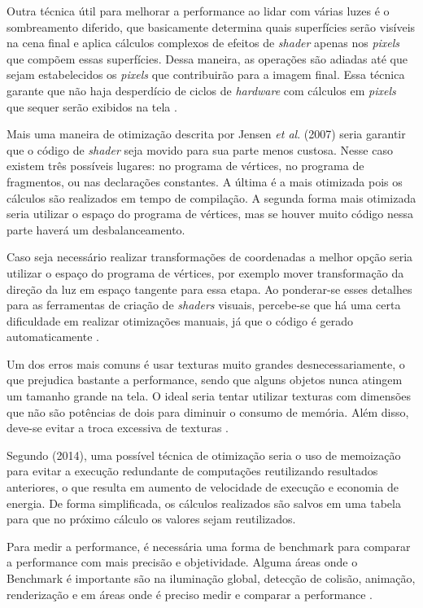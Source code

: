 Outra técnica útil para melhorar a performance ao lidar com várias luzes é o sombreamento diferido, que basicamente determina quais superfícies serão visíveis na cena final e aplica cálculos complexos de efeitos de \textit{shader} apenas nos \textit{pixels} que compõem essas superfícies. Dessa maneira, as operações são adiadas até que sejam estabelecidos os \textit{pixels} que contribuirão para a imagem final. Essa técnica garante que não haja desperdício de ciclos de \textit{hardware} com cálculos em \textit{pixels} que sequer serão exibidos na tela \cite{GLSLBook}.

Mais uma maneira de otimização descrita por Jensen \textit{et al}. (2007) seria garantir que o código de \textit{shader} seja movido para sua parte menos custosa. Nesse caso existem três possíveis lugares: no programa de vértices, no programa de fragmentos, ou nas declarações constantes. A última é a mais otimizada pois os cálculos são realizados em tempo de compilação. A segunda forma mais otimizada seria utilizar o espaço do programa de vértices, mas se houver muito código nessa parte haverá um desbalanceamento.

Caso seja necessário realizar transformações de coordenadas a melhor opção seria utilizar o espaço do programa de vértices, por exemplo mover transformação da direção da luz em espaço tangente para essa etapa. Ao ponderar-se esses detalhes para as ferramentas de criação de \textit{shaders} visuais, percebe-se que há uma certa dificuldade em realizar otimizações manuais, já que o código é gerado automaticamente \cite{jensen2007shader}.

Um dos erros mais comuns é usar texturas muito grandes desnecessariamente, o que prejudica bastante a performance, sendo que alguns objetos nunca atingem um tamanho grande na tela. O ideal seria tentar utilizar texturas com dimensões que não são potências de dois para diminuir o consumo de memória. Além disso, deve-se evitar a troca excessiva de texturas \cite{riguer2002performance}.

Segundo  (2014), uma possível técnica de otimização seria o uso de memoização para evitar a execução redundante de computações reutilizando resultados anteriores, o que resulta em aumento de velocidade de execução e economia de energia. De forma simplificada, os cálculos realizados são salvos em uma tabela para que no próximo cálculo os valores sejam reutilizados.

Para medir a performance, é necessária uma forma de \Gls{benchmark} para comparar a performance com mais precisão e objetividade. Alguma áreas onde o Benchmark é importante são na iluminação global, detecção de colisão, animação, renderização e em áreas onde é preciso medir e comparar a performance \cite{lext2001ray}.

